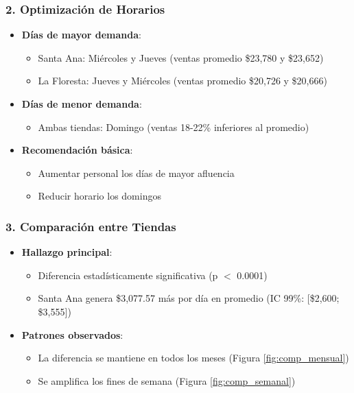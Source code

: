 \documentclass[12pt]{article}
\begin{document}
\subsubsection{2. Optimización de Horarios}

\begin{itemize}
\item \textbf{Días de mayor demanda}:
\begin{itemize}
\item Santa Ana: Miércoles y Jueves (ventas promedio \$23,780 y \$23,652)
\item La Floresta: Jueves y Miércoles (ventas promedio \$20,726 y \$20,666)
\end{itemize}

\item \textbf{Días de menor demanda}:
\begin{itemize}
\item Ambas tiendas: Domingo (ventas 18-22\% inferiores al promedio)
\end{itemize}

\item \textbf{Recomendación básica}:
\begin{itemize}
\item Aumentar personal los días de mayor afluencia
\item Reducir horario los domingos
\end{itemize}
\end{itemize}

\subsubsection{3. Comparación entre Tiendas}

\begin{itemize}
\item \textbf{Hallazgo principal}:
\begin{itemize}
\item Diferencia estadísticamente significativa (p $<$ 0.0001)
\item Santa Ana genera \$3,077.57 más por día en promedio (IC 99\%: [\$2,600; \$3,555])
\end{itemize}

\item \textbf{Patrones observados}:
\begin{itemize}
\item La diferencia se mantiene en todos los meses (Figura \ref{fig:comp_mensual})
\item Se amplifica los fines de semana (Figura \ref{fig:comp_semanal})
\end{itemize}
\end{itemize}
\end{document}
